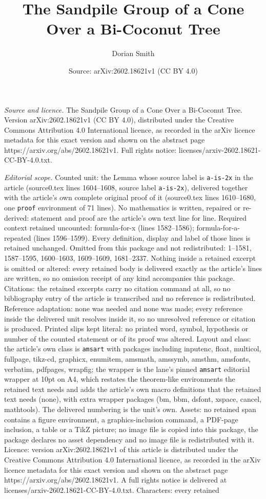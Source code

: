 \documentclass[10pt,a4paper]{amsart}
\title[The Sandpile Group of a Cone Over a Bi-Coconut Tree]{The Sandpile Group of a Cone Over a Bi-Coconut Tree}
\author{Dorian Smith}
\date{Source: arXiv:2602.18621v1 (CC BY 4.0)}
\begin{document}
\maketitle

\noindent\emph{Source and licence.} The Sandpile Group of a Cone Over a Bi-Coconut Tree. Version arXiv:2602.18621v1 (CC BY 4.0), distributed under the Creative Commons Attribution 4.0 International licence, as recorded in the arXiv licence metadata for this exact version and shown on the abstract page https://arxiv.org/abs/2602.18621v1. Full rights notice: licenses/arxiv-2602.18621-CC-BY-4.0.txt.\par\smallskip

\noindent\textit{Editorial scope.} Counted unit: the Lemma whose source label is \texttt{a-is-2x} in the article (source0.tex lines 1604--1608, source label \texttt{a-is-2x}), delivered together with the article's own complete original proof of it (source0.tex lines 1610--1680, one \texttt{proof} environment of 71 lines). No mathematics is written, repaired or re-derived: statement and proof are the article's own text line for line. Required context retained uncounted: formula-for-x (lines 1582--1586); formula-for-a-repeated (lines 1596--1599). Every definition, display and label of those lines is retained unchanged. Omitted from this package and not redistributed: 1--1581, 1587--1595, 1600--1603, 1609--1609, 1681--2337. Nothing inside a retained excerpt is omitted or altered: every retained body is delivered exactly as the article's lines are written, so no omission receipt of any kind accompanies this package. Citations: the retained excerpts carry no citation command at all, so no bibliography entry of the article is transcribed and no reference is redistributed. Reference adaptation: none was needed and none was made; every reference inside the delivered unit resolves inside it, so no unresolved reference or citation is produced. Printed slips kept literal: no printed word, symbol, hypothesis or number of the counted statement or of its proof was altered. Layout and class: the article's own class is \texttt{amsart} with packages including inputenc, float, multicol, fullpage, tikz-cd, graphicx, enumitem, amsmath, amssymb, amsthm, amsfonts, verbatim, pdfpages, wrapfig; the wrapper is the lane's pinned \texttt{amsart} editorial wrapper at 10pt on A4, which restates the theorem-like environments the retained text needs and adds the article's own macro definitions that the retained text needs (none), with extra wrapper packages (bm, bbm, dsfont, xspace, cancel, mathtools). The delivered numbering is the unit's own. Assets: no retained span contains a figure environment, a graphics-inclusion command, a PDF-page inclusion, a table or a TikZ picture; no image file is copied into this package, the package declares no asset dependency and no image file is redistributed with it. Licence: version arXiv:2602.18621v1 of this article is distributed under the Creative Commons Attribution 4.0 International licence, as recorded in the arXiv licence metadata for this exact version and shown on the abstract page https://arxiv.org/abs/2602.18621v1. A full rights notice is delivered at licenses/arxiv-2602.18621-CC-BY-4.0.txt. Characters: every retained 
\end{document}
